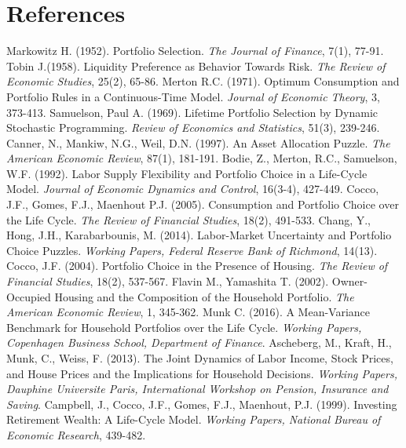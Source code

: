 \documentclass[]{elsarticle}
\begin{document}
\section{References}
\begin{thebibliography}{}
 Markowitz H. (1952). Portfolio Selection. \textit{The Journal of Finance}, 7(1), 77-91.
 Tobin J.(1958). Liquidity Preference as Behavior Towards Risk. \textit{The Review of Economic Studies}, 25(2), 65-86.
 Merton R.C. (1971). Optimum Consumption and Portfolio Rules in a Continuous-Time Model. \textit{Journal of Economic Theory}, 3, 373-413.
 Samuelson, Paul A. (1969). Lifetime Portfolio Selection by Dynamic Stochastic Programming. \textit{Review of Economics and Statistics}, 51(3), 239-246.
 Canner, N., Mankiw, N.G., Weil, D.N. (1997). An Asset Allocation Puzzle. \textit{The American Economic Review}, 87(1), 181-191.
Bodie, Z., Merton, R.C., Samuelson, W.F. (1992). Labor Supply Flexibility and Portfolio Choice in a Life-Cycle Model. \textit{Journal of Economic Dynamics and Control}, 16(3-4), 427-449. 
 Cocco, J.F., Gomes, F.J., Maenhout P.J. (2005). Consumption and Portfolio Choice over the Life Cycle. \textit{The Review of Financial Studies}, 18(2), 491-533. 
 Chang, Y., Hong, J.H., Karabarbounis, M. (2014). Labor-Market Uncertainty and Portfolio Choice Puzzles. \textit{Working Papers, Federal Reserve Bank of Richmond}, 14(13).
 Cocco, J.F. (2004). Portfolio Choice in the Presence of Housing. \textit{The Review of Financial Studies}, 18(2), 537-567.
 Flavin M., Yamashita T. (2002). Owner-Occupied Housing and the Composition of the Household Portfolio. \textit{The American Economic Review}, 1, 345-362.
 Munk C. (2016). A Mean-Variance Benchmark for Household Portfolios over the Life Cycle. \textit{Working Papers, Copenhagen Business School, Department of Finance}.
 Ascheberg, M., Kraft, H., Munk, C., Weiss, F. (2013). The Joint Dynamics of Labor Income, Stock Prices, and House Prices and the Implications for Household Decisions. \textit{Working Papers, Dauphine Universite Paris, International Workshop on Pension, Insurance and Saving}.
 Campbell, J., Cocco, J.F., Gomes, F.J., Maenhout, P.J. (1999). Investing Retirement Wealth: A Life-Cycle Model. \textit{Working Papers, National Bureau of Economic Research}, 439-482.

\end{thebibliography}
\end{document}

